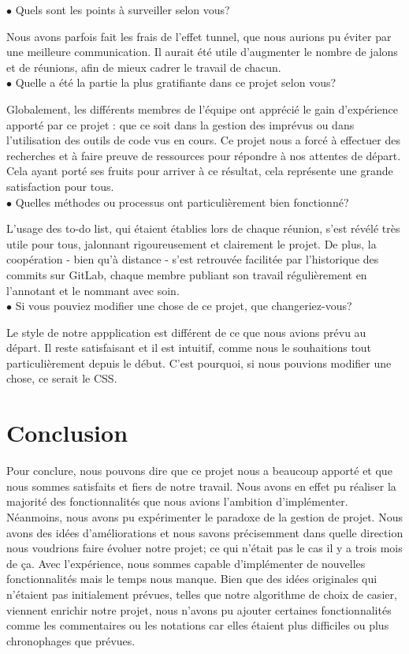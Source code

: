 \documentclass[11pt]{article}
\begin{document}
$\bullet$ Quels sont les points à surveiller selon vous? 

Nous avons parfois fait les frais de l'effet tunnel, que nous aurions pu éviter par une meilleure communication. Il aurait été utile d'augmenter le nombre de jalons et de réunions, afin de mieux cadrer le travail de chacun. \\

$\bullet$ Quelle a été la partie la plus gratifiante dans ce projet selon vous? 

Globalement, les différents membres de l'équipe ont apprécié le gain d'expérience apporté par ce projet : que ce soit dans la gestion des imprévus ou dans l'utilisation des outils de code vus en cours. Ce projet nous a forcé à effectuer des recherches et à faire preuve de ressources pour répondre à nos attentes de départ. Cela ayant porté ses fruits pour arriver à ce résultat, cela représente une grande satisfaction pour tous. \\

$\bullet$ Quelles méthodes ou processus ont particulièrement bien fonctionné? 

L'usage des to-do list, qui étaient établies lors de chaque réunion, s'est révélé très utile pour tous, jalonnant rigoureusement et clairement le projet. De plus, la coopération - bien qu'à distance - s'est retrouvée facilitée par l'historique des commits sur GitLab, chaque membre publiant son travail régulièrement en l'annotant et le nommant avec soin. \\

$\bullet$ Si vous pouviez modifier une chose de ce projet, que changeriez-vous? 

Le style de notre appplication est différent de ce que nous avions prévu au départ. Il reste satisfaisant et il est intuitif, comme nous le souhaitions tout particulièrement depuis le début. C'est pourquoi, si nous pouvions modifier une chose, ce serait le CSS.

\newpage


\section{Conclusion}

Pour conclure, nous pouvons dire que ce projet nous a beaucoup apporté et que nous sommes satisfaits et fiers de notre travail. Nous avons en effet pu réaliser la majorité des fonctionnalités que nous avions l'ambition d'implémenter. Néanmoins, nous avons pu expérimenter le paradoxe de la gestion de projet. Nous avons des idées d'améliorations et nous savons précisemment dans quelle direction nous voudrions faire évoluer notre projet; ce qui n'était pas le cas il y a trois mois de ça. Avec l'expérience, nous sommes capable d’implémenter de nouvelles fonctionnalités mais le temps nous manque. Bien que des idées originales qui n'étaient pas initialement prévues, telles que notre algorithme de choix de casier, viennent enrichir notre projet, nous n'avons pu ajouter certaines fonctionnalités comme les commentaires ou les notations car elles étaient plus difficiles ou plus chronophages que prévues.
\end{document}
